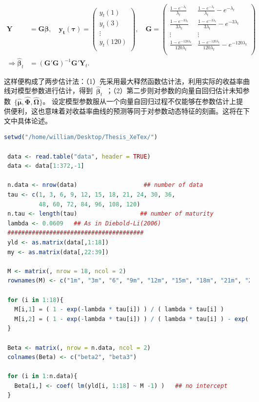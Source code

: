   \begin{align}\label{ols}
   \mathbf{Y} &= \mathbf{G}\mathbf{\beta} ,\quad
   \mathbf{y_t(\tau)}  =
     \begin{pmatrix}
       y_t(1) \\
       y_t(3) \\
       \vdots \\
       y_t(120) \\
     \end{pmatrix},\quad
   \mathbf{G} = 
     \begin{pmatrix}
        \frac{1-e^{-\lambda_{t} }} {\lambda_{t}  } & \frac{1-e^{-\lambda_{t}  }} {\lambda_{t}  } - e^{-\lambda_{t}  } \\
        \frac{1-e^{-3\lambda_{t}  }} {3\lambda_{t} } & \frac{1-e^{-3\lambda_{t}  }} {3\lambda_{t}  } - e^{-3\lambda_{t} } \\
         \vdots &  \vdots\\
        \frac{1-e^{-120\lambda_{t} }} {120\lambda_{t}  } & \frac{1-e^{-120\lambda_{t} }} {120\lambda_{t} } - e^{-120\lambda_{t}} \\
     \end{pmatrix} \\
     \Rightarrow 
     \hat{\mathbf{\beta}}_t &= ( \mathbf{G} '  \mathbf{G})^{-1}  \mathbf{G}'\mathbf{Y}_t .
  \end{align}
 
 这样便构成了两步估计法：（1）先采用最大释然函数估计法，利用实际的收益率曲线对模型参数进行估计，得到~$\hat{\mathbf{\beta}}_t$~；（2）第二步则对参数的向量自回归估计未知参数~$\{\hat{\mathbf{\mu}}, \hat{\mathbf{\Phi}}, \hat{\mathbf{\Omega}}\}$。  设定模型参数服从一个向量自回归过程不仅能够在参数估计上提供便利，这也意味着对收益率曲线的预测等同于对参数动态特征的刻画。这将在下文中具体论述。
 
 \begin{lstlisting}[language=R]
 setwd("/home/william/Desktop/Thesis_XeTex/")

 data <- read.table("data", header = TRUE)
 data <- data[1:372,-1]    

 n.data <- nrow(data)                   ## number of data
 tau <- c(1, 3, 6, 9, 12, 15, 18, 21, 24, 30, 36,
          48, 60, 72, 84, 96, 108, 120)
 n.tau <- length(tau)                  ## number of maturity
 lambda <- 0.0609   ## As in Diebold-Li(2006)
 #######################################
 yld <- as.matrix(data[,1:18])
 my <- as.matrix(data[,22:39])

 M <- matrix(, nrow = 18, ncol = 2) 
 rownames(M) <- c("1m", "3m", "6", "9m", "12m", "15m", "18m", "21m", "24m", "30m", "36m", "48m", "60m", "72m", "84m", "96m", "108m", "120m")
 
 for (i in 1:18){
   M[i,1] = ( 1 - exp(-lambda * tau[i]) ) / ( lambda * tau[i] )
   M[i,2] = ( 1 - exp(-lambda * tau[i]) ) / ( lambda * tau[i] ) - exp( - lambda * tau[i]) 
 }
 
 Beta <- matrix(, nrow = n.data, ncol = 2)
 colnames(Beta) <- c("beta2", "beta3")
 
 for (i in 1:n.data){
   Beta[i,] <- coef( lm(yld[i, 1:18] ~ M -1) )   ## no intercept
 }
 \end{lstlisting}

